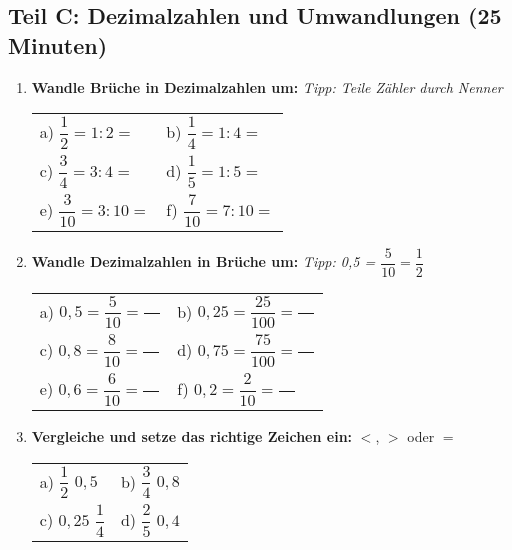 \subsection*{Teil C: Dezimalzahlen und Umwandlungen (25 Minuten)}

\begin{enumerate}[label=\arabic*.]
    \item \textbf{Wandle Brüche in Dezimalzahlen um:}
    \textit{Tipp: Teile Zähler durch Nenner}
    \vspace{0.5cm}
    \begin{tabular}{ll}
        a) $\dfrac{1}{2} = 1 : 2 =$ \underline{\hspace{3cm}} & b) $\dfrac{1}{4} = 1 : 4 =$ \underline{\hspace{3cm}} \\[2ex]
        c) $\dfrac{3}{4} = 3 : 4 =$ \underline{\hspace{3cm}} & d) $\dfrac{1}{5} = 1 : 5 =$ \underline{\hspace{3cm}} \\[2ex]
        e) $\dfrac{3}{10} = 3 : 10 =$ \underline{\hspace{3cm}} & f) $\dfrac{7}{10} = 7 : 10 =$ \underline{\hspace{3cm}}
    \end{tabular}

    \vspace{1cm}

    \item \textbf{Wandle Dezimalzahlen in Brüche um:}
    \textit{Tipp: 0,5 = $\dfrac{5}{10} = \dfrac{1}{2}$}
    \vspace{0.5cm}
        \begin{tabular}{ll}
        a) $0{,}5 = \dfrac{5}{10} = \dfrac{\phantom{00}}{\phantom{00}}$ & b) $0{,}25 = \dfrac{25}{100} = \dfrac{\phantom{00}}{\phantom{00}}$ \\[3ex]
        c) $0{,}8 = \dfrac{8}{10} = \dfrac{\phantom{00}}{\phantom{00}}$ & d) $0{,}75 = \dfrac{75}{100} = \dfrac{\phantom{00}}{\phantom{00}}$ \\[3ex]
        e) $0{,}6 = \dfrac{6}{10} = \dfrac{\phantom{00}}{\phantom{00}}$ & f) $0{,}2 = \dfrac{2}{10} = \dfrac{\phantom{00}}{\phantom{00}}$
    \end{tabular}

    \vspace{1cm}

    \item \textbf{Vergleiche und setze das richtige Zeichen ein:} $<$, $>$ oder $=$
    \vspace{0.5cm}
    \begin{tabular}{ll}
        a) $\dfrac{1}{2}$ \underline{\hspace{1cm}} $0{,}5$ & b) $\dfrac{3}{4}$ \underline{\hspace{1cm}} $0{,}8$ \\[2ex]
        c) $0{,}25$ \underline{\hspace{1cm}} $\dfrac{1}{4}$ & d) $\dfrac{2}{5}$ \underline{\hspace{1cm}} $0{,}4$
    \end{tabular}
\end{enumerate}